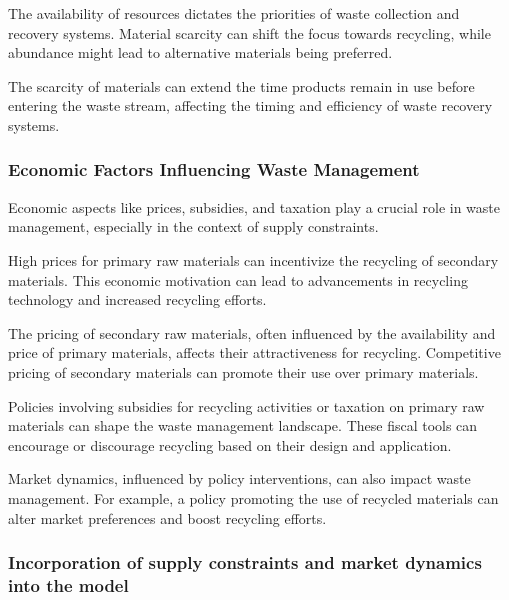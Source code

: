 The availability of resources dictates the priorities of waste collection and recovery systems. Material scarcity can shift the focus towards recycling, while abundance might lead to alternative materials being preferred.

The scarcity of materials can extend the time products remain in use before entering the waste stream, affecting the timing and efficiency of waste recovery systems.

\subsubsection{Economic Factors Influencing Waste Management}
Economic aspects like prices, subsidies, and taxation play a crucial role in waste management, especially in the context of supply constraints.

High prices for primary raw materials can incentivize the recycling of secondary materials. This economic motivation can lead to advancements in recycling technology and increased recycling efforts.

The pricing of secondary raw materials, often influenced by the availability and price of primary materials, affects their attractiveness for recycling. Competitive pricing of secondary materials can promote their use over primary materials.

Policies involving subsidies for recycling activities or taxation on primary raw materials can shape the waste management landscape. These fiscal tools can encourage or discourage recycling based on their design and application.

Market dynamics, influenced by policy interventions, can also impact waste management. For example, a policy promoting the use of recycled materials can alter market preferences and boost recycling efforts.

\subsubsection{Incorporation of supply constraints and market dynamics into the model}


